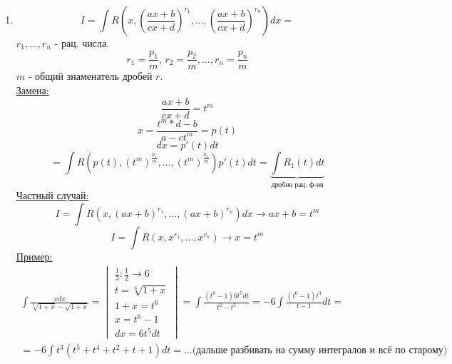 \documentclass[12pt]{article}
\begin{document}
\begin{enumerate}
        \item \[ I = \int R\left( x, \left(\frac{ax+b}{cx+d}\right)^{r_1}, \dots, \left( \frac{ax+b}{cx+d} \right)^{r_n} \right)dx \boxed{=}\]
        $r_1, \dots, r_n$ - рац. числа.
        \[ r_1 = \frac{p_1}{m},\, r_2 = \frac{p_2}{m}, \dots, r_n = \frac{p_n}{m} \]
        $m$ - общий знаменатель дробей $r$.\\
        \underline{Замена:}
        \[ \boxed{\frac{ax + b}{cx + d} = t^m} \]
        \[ x = \frac{t^m * d - b}{a - ct^m} = p(t) \]
        \[ dx = p'(t)dt \]
        \[ \boxed{=} \int R (p(t), (t^m)^{\frac{p_1}{m}}, \dots, (t^m)^{\frac{p_n}{m}})p'(t)dt = \underbrace{\int R_1(t)dt}_{\text{дробно рац. ф-ия}} \]
        \underline{Частный случай:}
        \[ I = \int R(x, (ax+b)^{r_1}, \dots, (ax+b)^{r_n})dx \to ax+b = t^m \]
        \[ I = \int R(x, x^{r_1}, \dots, x^{r_n} ) \to x = t^m \]
        \underline{Пример:}
        \begin{gather*}
            \int \frac{xdx}{\sqrt[3]{1+x} - \sqrt{1 + x}} = \begin{vmatrix}
                \frac{1}{3} : \frac{1}{2} \to 6\\
                t = \sqrt[6]{1 + x}\\
                1 + x = t^6\\
                x = t^6 - 1\\
                dx = 6t^5dt
            \end{vmatrix} = \int \frac{(t^6 - 1)6t^5dt}{t^2 - t^3} = -6 \int \frac{(t^6 - 1)t^3}{t-1}dt =\\
            = -6 \int t^3(t^5 + t^4 + t^2 + t + 1)dt = \dots \text{(дальше разбивать на сумму интегралов и всё по старому)}
        \end{gather*}


\end{enumerate}
\end{document}
